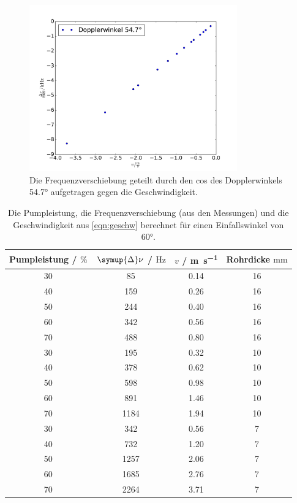 \documentclass[
  bibliography=totoc,     %
  captions=tableheading,  %
  titlepage=firstiscover, %
]{scrartcl}
\begin{document}
      \begin{figure}
        \centering
          \includegraphics[width=0.8\textwidth]{a60.pdf}
          \caption{Die Frequenzverschiebung geteilt durch den cos des
          Dopplerwinkels 54.7° aufgetragen gegen die Geschwindigkeit.}
          \label{fig:3}
      \end{figure}

      \begin{table}
        \centering
        \begin{tabular}{c c c c}
          \toprule
          Pumpleistung / $\%$ & $\symup{\Delta} \nu$ / $\si{\hertz}$ & $v$ /
          \si{\meter\per\second} & Rohrdicke $\si{\milli\meter}$ \\
          \midrule
          30 & 85 & 0.14 & 16\\
          40 & 159 & 0.26 & 16\\
          50 & 244 & 0.40 & 16\\
          60 & 342 & 0.56 & 16\\
          70 & 488 & 0.80 & 16\\
          30 & 195 & 0.32 & 10\\
          40 & 378 & 0.62 & 10\\
          50 & 598 & 0.98 & 10\\
          60 & 891 & 1.46 & 10\\
          70 & 1184 & 1.94 & 10\\
          30 & 342 & 0.56 & 7\\
          40 & 732 & 1.20 & 7\\
          50 & 1257 & 2.06 & 7\\
          60 & 1685 & 2.76 & 7\\
          70 & 2264 & 3.71 & 7\\
          \bottomrule
        \end{tabular}
        \caption{Die Pumpleistung, die Frequenzverschiebung (aus den Messungen)
        und die Geschwindigkeit aus \eqref{eqn:geschw} berechnet für einen
        Einfallswinkel von 60°.}
        \label{tab:4}
      \end{table}
\end{document}
